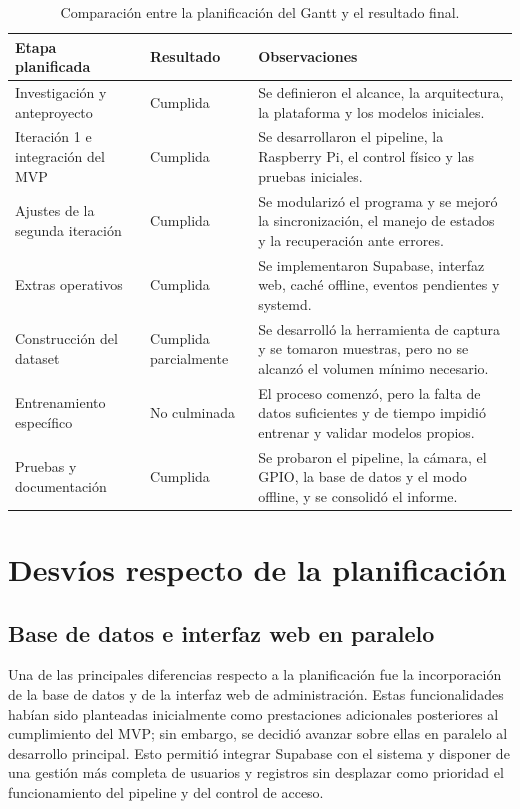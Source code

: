 \begin{table}[H]
    \centering
    \small
    \renewcommand{\baselinestretch}{1.15}\selectfont
    \begin{tabular}{|p{3.5cm}|p{2.4cm}|p{7.9cm}|}
        \hline
        \textbf{Etapa planificada} & \textbf{Resultado} & \textbf{Observaciones} \\ \hline
        Investigación y anteproyecto & Cumplida & Se definieron el alcance, la arquitectura, la plataforma y los modelos iniciales. \\ \hline
        Iteración 1 e integración del MVP & Cumplida & Se desarrollaron el pipeline, la Raspberry Pi, el control físico y las pruebas iniciales. \\ \hline
        Ajustes de la segunda iteración & Cumplida & Se modularizó el programa y se mejoró la sincronización, el manejo de estados y la recuperación ante errores. \\ \hline
        Extras operativos & Cumplida & Se implementaron Supabase, interfaz web, caché offline, eventos pendientes y systemd. \\ \hline
        Construcción del dataset & Cumplida parcialmente & Se desarrolló la herramienta de captura y se tomaron muestras, pero no se alcanzó el volumen mínimo necesario. \\ \hline
        Entrenamiento específico & No culminada & El proceso comenzó, pero la falta de datos suficientes y de tiempo impidió entrenar y validar modelos propios. \\ \hline
        Pruebas y documentación & Cumplida & Se probaron el pipeline, la cámara, el GPIO, la base de datos y el modo offline, y se consolidó el informe. \\ \hline
    \end{tabular}
    \caption{Comparación entre la planificación del Gantt y el resultado final.}
    \label{tab:cumplimiento-gantt}
\end{table}

\section{Desvíos respecto de la planificación}

\subsection{Base de datos e interfaz web en paralelo}

Una de las principales diferencias respecto a la planificación fue la incorporación de la base de datos y de la interfaz web de administración. Estas funcionalidades habían sido planteadas inicialmente como prestaciones adicionales posteriores al cumplimiento del MVP; sin embargo, se decidió avanzar sobre ellas en paralelo al desarrollo principal. Esto permitió integrar Supabase con el sistema y disponer de una gestión más completa de usuarios y registros sin desplazar como prioridad el funcionamiento del pipeline y del control de acceso.

